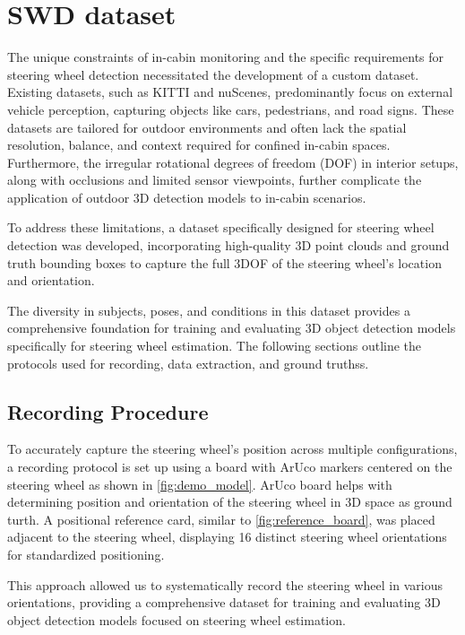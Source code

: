\chapter{SWD dataset}

The unique constraints of in-cabin monitoring and the specific 
requirements for steering wheel detection necessitated the development 
of a custom dataset. Existing datasets, such as KITTI and nuScenes, 
predominantly focus on external vehicle perception, capturing objects 
like cars, pedestrians, and road signs. These datasets are tailored 
for outdoor environments and often lack the spatial resolution, 
balance, and context required for confined in-cabin spaces. 
Furthermore, the irregular rotational degrees of freedom (DOF) in 
interior setups, along with occlusions and limited sensor viewpoints, 
further complicate the application of outdoor 3D detection models to 
in-cabin scenarios.

To address these limitations, a dataset specifically designed for 
steering wheel detection was developed, incorporating high-quality 3D 
point clouds and ground truth bounding boxes to capture the full 3DOF 
of the steering wheel’s location and orientation.

The diversity in subjects, poses, and conditions in this dataset 
provides a comprehensive foundation for training and evaluating 3D 
object detection models specifically for steering wheel estimation. 
The following sections outline the protocols used for recording, 
data extraction, and ground truthss.


\section{Recording Procedure}
To accurately capture the steering wheel's position across multiple 
configurations, a recording protocol is set up using a board with 
ArUco markers \cite{opencv_aruco_detection} centered on the steering wheel as shown in \cref{fig:demo_model}. 
ArUco board helps with determining position and orientation of 
the steering wheel in 3D space as ground turth. A positional reference card, 
similar to \cref{fig:reference_board}, was placed adjacent to the steering wheel, displaying 
16 distinct steering wheel orientations for standardized positioning. 

This approach allowed us to systematically record the steering wheel 
in various orientations, providing a comprehensive dataset for training 
and evaluating 3D object detection models focused on steering wheel 
estimation.

